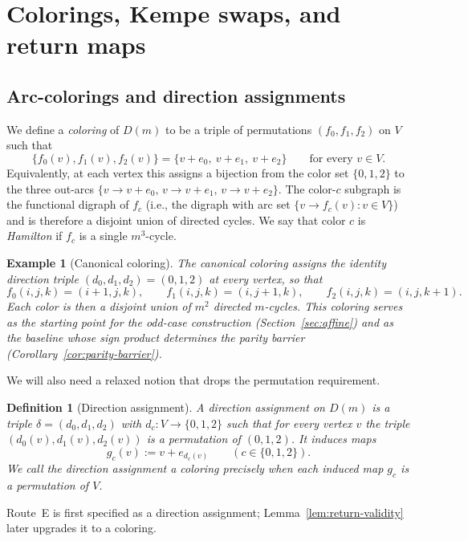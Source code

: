 \documentclass[11pt]{article}
\newtheorem{definition}{Definition}
\newtheorem{example}{Example}
\begin{document}
\section{Colorings, Kempe swaps, and return maps}\label{sec:prelim}

\subsection{Arc-colorings and direction assignments}
We define a \emph{coloring} of $D(m)$ to be a triple of permutations $(f_0,f_1,f_2)$ on $V$ such that
\[
\{f_0(v),f_1(v),f_2(v)\}=\{v+e_0,\ v+e_1,\ v+e_2\}
\qquad\text{for every }v\in V.
\]
Equivalently, at each vertex this assigns a bijection from the color set $\{0,1,2\}$ to the three out-arcs $\{v\to v+e_0,\, v\to v+e_1,\, v\to v+e_2\}$.
The color-$c$ subgraph is the functional digraph of $f_c$ (i.e., the digraph with arc set $\{v\to f_c(v):v\in V\}$) and is therefore a disjoint union of directed cycles.
We say that color $c$ is \emph{Hamilton} if $f_c$ is a single $m^3$-cycle.

\begin{example}[Canonical coloring]\label{ex:canonical}
The \emph{canonical coloring} assigns the identity direction triple
$(d_0,d_1,d_2)=(0,1,2)$ at every vertex, so that
\[
f_0(i,j,k)=(i+1,j,k),\qquad f_1(i,j,k)=(i,j+1,k),\qquad f_2(i,j,k)=(i,j,k+1).
\]
Each color is then a disjoint union of $m^2$ directed $m$-cycles.
This coloring serves as the starting point for the odd-case construction (Section~\ref{sec:affine})
and as the baseline whose sign product determines the parity barrier (Corollary~\ref{cor:parity-barrier}).
\end{example}

We will also need a relaxed notion that drops the permutation requirement.

\begin{definition}[Direction assignment]\label{def:direction-assignment}
A \emph{direction assignment} on $D(m)$ is a triple $\delta=(d_0,d_1,d_2)$ with $d_c:V\to\{0,1,2\}$ such that for every vertex $v$ the triple $(d_0(v),d_1(v),d_2(v))$ is a permutation of $(0,1,2)$.
It induces maps
\[
g_c(v):=v+e_{d_c(v)}\qquad (c\in\{0,1,2\}).
\]
We call the direction assignment a \emph{coloring} precisely when each induced map $g_c$ is a permutation of $V$.
\end{definition}

Route~E is first specified as a direction assignment; Lemma~\ref{lem:return-validity} later upgrades it to a coloring.
\end{document}
